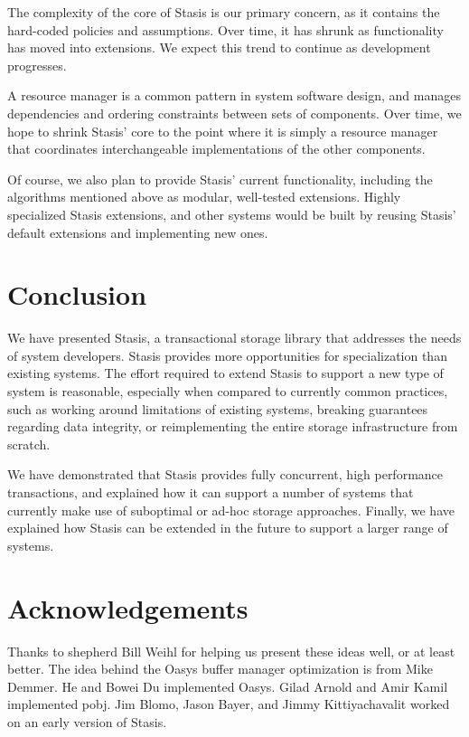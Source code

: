 \documentclass[letterpaper,twocolumn,10pt]{article}
\newcommand{\yad}{Stasis\xspace}
\newcommand{\yads}{Stasis'\xspace}
\newcommand{\oasys}{Oasys\xspace}
\begin{document}
The complexity of the core of \yad is our primary concern, as it
contains the hard-coded policies and assumptions.  Over time, it has
shrunk as functionality has moved into extensions.  We expect
this trend to continue as development progresses.  

A resource manager is a common pattern in system software design, and
manages dependencies and ordering constraints between sets of
components.  Over time, we hope to shrink \yads core to the point
where it is simply a resource manager that coordinates interchangeable
implementations of the other components.

Of course, we also plan to provide \yads current functionality, including the algorithms
mentioned above as modular, well-tested extensions.
Highly specialized \yad extensions, and other systems would be built
by reusing \yads default extensions and implementing new ones.


\section{Conclusion}

We have presented \yad, a transactional storage library that addresses
the needs of system developers.  \yad provides more opportunities for
specialization than existing systems.  The effort required to extend
\yad to support a new type of system is reasonable, especially when
compared to currently common practices, such as working around
limitations of existing systems, breaking guarantees regarding data
integrity, or reimplementing the entire storage infrastructure from
scratch.

We have demonstrated that \yad provides fully
concurrent, high performance transactions, and explained how it can
support a number of systems that currently make use of suboptimal or
ad-hoc storage approaches.  Finally, we have explained how \yad can be
extended in the future to support a larger range of systems.

\section{Acknowledgements}

Thanks to shepherd Bill Weihl for helping us present these ideas well,
or at least better. The idea behind the \oasys buffer manager
optimization is from Mike Demmer.  He and Bowei Du implemented \oasys.
Gilad Arnold and Amir Kamil implemented
 pobj.  Jim Blomo, Jason Bayer, and Jimmy
Kittiyachavalit worked on an early version of \yad.
\end{document}
